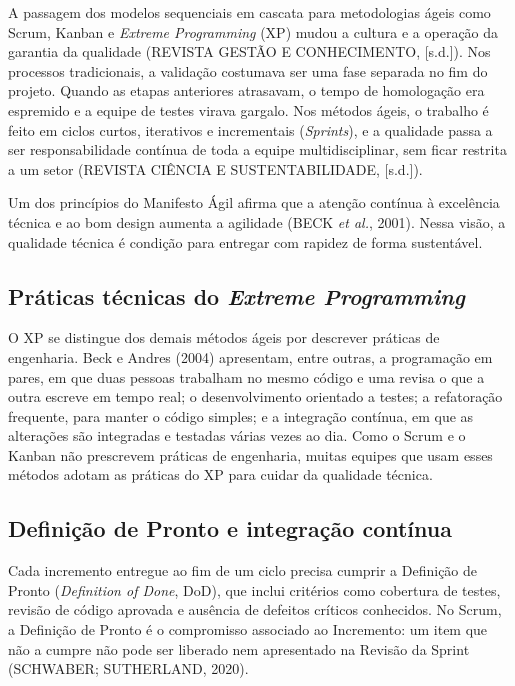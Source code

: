 \documentclass[12pt,a4paper]{article}
\begin{document}
A passagem dos modelos sequenciais em cascata para metodologias ágeis como Scrum, Kanban e \textit{Extreme Programming} (XP) mudou a cultura e a operação da garantia da qualidade (REVISTA GESTÃO E CONHECIMENTO, [s.d.]). Nos processos tradicionais, a validação costumava ser uma fase separada no fim do projeto. Quando as etapas anteriores atrasavam, o tempo de homologação era espremido e a equipe de testes virava gargalo. Nos métodos ágeis, o trabalho é feito em ciclos curtos, iterativos e incrementais (\textit{Sprints}), e a qualidade passa a ser responsabilidade contínua de toda a equipe multidisciplinar, sem ficar restrita a um setor (REVISTA CIÊNCIA E SUSTENTABILIDADE, [s.d.]).

Um dos princípios do Manifesto Ágil afirma que a atenção contínua à excelência técnica e ao bom design aumenta a agilidade (BECK \textit{et al.}, 2001). Nessa visão, a qualidade técnica é condição para entregar com rapidez de forma sustentável.

\subsection{Práticas técnicas do \textit{Extreme Programming}}

O XP se distingue dos demais métodos ágeis por descrever práticas de engenharia. Beck e Andres (2004) apresentam, entre outras, a programação em pares, em que duas pessoas trabalham no mesmo código e uma revisa o que a outra escreve em tempo real; o desenvolvimento orientado a testes; a refatoração frequente, para manter o código simples; e a integração contínua, em que as alterações são integradas e testadas várias vezes ao dia. Como o Scrum e o Kanban não prescrevem práticas de engenharia, muitas equipes que usam esses métodos adotam as práticas do XP para cuidar da qualidade técnica.

\subsection{Definição de Pronto e integração contínua}

Cada incremento entregue ao fim de um ciclo precisa cumprir a Definição de Pronto (\textit{Definition of Done}, DoD), que inclui critérios como cobertura de testes, revisão de código aprovada e ausência de defeitos críticos conhecidos. No Scrum, a Definição de Pronto é o compromisso associado ao Incremento: um item que não a cumpre não pode ser liberado nem apresentado na Revisão da Sprint (SCHWABER; SUTHERLAND, 2020).
\end{document}
